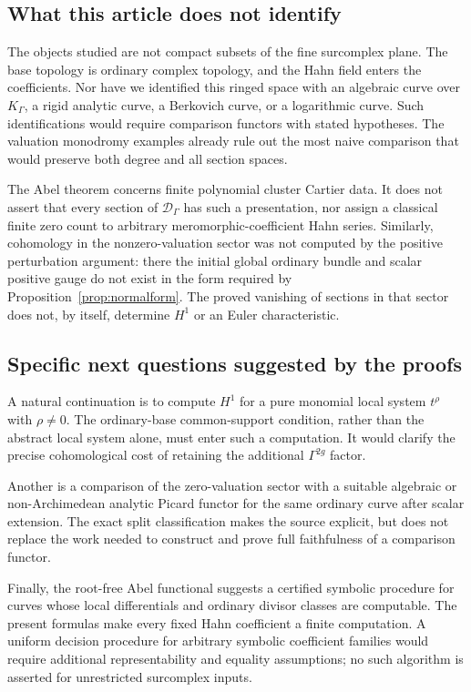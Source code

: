 \documentclass[11pt,letterpaper]{article}
\numberwithin{equation}{section}
\theoremstyle{definition}
\theoremstyle{remark}
\newcommand{\Kg}{K_\Gamma}
\begin{document}
\subsection{What this article does not identify}
The objects studied are not compact subsets of the fine surcomplex
plane. The base topology is ordinary complex topology, and the Hahn
field enters the coefficients. Nor have we identified this ringed
space with an algebraic curve over $\Kg$, a rigid analytic curve,
a Berkovich curve, or a logarithmic curve. Such identifications would
require comparison functors with stated hypotheses. The valuation
monodromy examples already rule out the most naive comparison that
would preserve both degree and all section spaces.

The Abel theorem concerns finite polynomial cluster Cartier data. It
does not assert that every section of
$\mathscr D_\Gamma$ has such a presentation, nor assign a classical
finite zero count to arbitrary meromorphic-coefficient Hahn series.
Similarly, cohomology in the nonzero-valuation sector was not computed
by the positive perturbation argument: there the initial global
ordinary bundle and scalar positive gauge do not exist in the form
required by Proposition~\ref{prop:normalform}. The proved vanishing
of sections in that sector does not, by itself, determine $H^1$ or an
Euler characteristic.

\subsection{Specific next questions suggested by the proofs}
A natural continuation is to compute $H^1$ for a pure monomial local
system $t^\rho$ with $\rho\ne0$. The ordinary-base common-support
condition, rather than the abstract local system alone, must enter
such a computation. It would clarify the precise cohomological cost
of retaining the additional $\Gamma^{2g}$ factor.

Another is a comparison of the zero-valuation sector with a suitable
algebraic or non-Archimedean analytic Picard functor for the same
ordinary curve after scalar extension. The exact split classification
makes the source explicit, but does not replace the work needed to
construct and prove full faithfulness of a comparison functor.

Finally, the root-free Abel functional suggests a certified symbolic
procedure for curves whose local differentials and ordinary divisor
classes are computable. The present formulas make every fixed Hahn
coefficient a finite computation. A uniform decision procedure for
arbitrary symbolic coefficient families would require additional
representability and equality assumptions; no such algorithm is
asserted for unrestricted surcomplex inputs.
\end{document}
